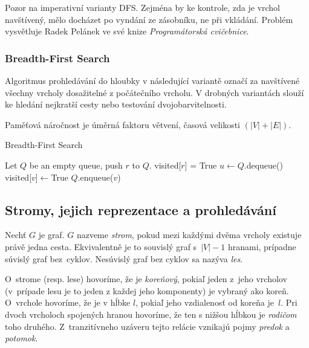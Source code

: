 Pozor na  imperativní varianty DFS. Zejména by ke kontrole,
zda je vrchol navštívený, mělo docházet po vyndání ze zásobníku, ne při
vkládání.
Problém vysvětluje Radek Pelánek ve své knize {\em Programátorská
cvičebnice}.

\subsubsection*{Breadth-First Search}

Algoritmus prohledávání do hloubky v následující variantě označí za
navštívené všechny vrcholy dosažitelné z počátečního vrcholu. V drobných
variantách slouží ke hledání nejkratší cesty nebo testování
dvojobarvitelnosti.

Paměťová náročnost je úměrná faktoru větvení, časová velikosti
$(\lvert V \rvert + \lvert E \rvert)$.

\begin{algorithm}
\caption{Breadth-First Search}
\begin{algorithmic}[1]
    \State Let $Q$ be an empty queue, push $r$ to $Q$.
    \State visited[$r$] = True
        \State $u \gets Q$.dequeue()
                \State visited[$v$]$ \gets $True
                \State $Q$.enqueue($v$)
            \EndIf
        \EndFor
    \EndWhile
\EndFunction
\end{algorithmic}
\end{algorithm}


\subsection{Stromy, jejich reprezentace a prohledávání}

Nechť $G$ je graf. $G$ nazveme {\em strom}, pokud mezi každými dvěma
vrcholy existuje právě jedna cesta. Ekvivalentně je to souvislý graf
s~$\lvert V \rvert - 1$ hranami, prípadne súvislý graf bez~cyklov. 
Nesúvislý graf bez cyklov sa nazýva {\em les}. 

O~strome (resp. lese) hovoríme, že je {\em koreňový}, pokiaľ jeden 
z~jeho vrcholov (v~prípade lesu je to jeden z každej jeho komponenty)
je vybraný ako koreň. O~vrchole hovoríme, že je v hĺbke $l$, pokiaľ 
jeho vzdialenosť od koreňa je~$l$. Pri dvoch vrcholoch spojených
hranou hovoríme, že ten s nižšou hĺbkou je {\em rodičom} toho druhého.
Z~tranzitívneho uzáveru tejto relácie vznikajú pojmy {\em predok} a 
{\em potomok}.

